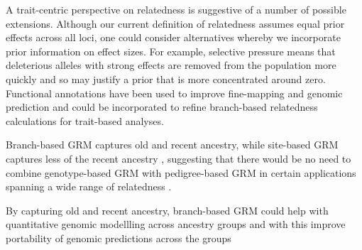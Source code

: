 
A trait-centric perspective on relatedness is suggestive of a number of possible extensions. Although our current definition of relatedness assumes equal prior effects across all loci, one could consider alternatives whereby we incorporate prior information on effect sizes. For example, selective pressure means that deleterious alleles with strong effects are removed from the population more quickly and so may justify a prior that is more concentrated around zero. Functional annotations have been used to improve fine-mapping and genomic prediction \citep{weissbrod2020functionally, weissbrod2022leveraging} and could be incorporated to refine branch-based relatedness calculations for trait-based analyses.

Branch-based GRM captures old and recent ancestry, while site-based GRM captures less of the recent ancestry
\citep[e.g.]{fan2022genealogical, young2022discovering}, suggesting that there would be no need to combine genotype-based GRM with pedigree-based GRM in certain applications spanning a wide range of relatedness \citep[e.g.]{vanraden2008efficient, kemper2021phenotypic}.

By capturing old and recent ancestry,
branch-based GRM could help with quantitative genomic modellling across ancestry groups
and with this improve portability of genomic predictions across the groups
\citep{legarra2021correlation, durvasula2021negative, wang2022challenges, prive2022portability, schultz2022stability, yair2022population}


